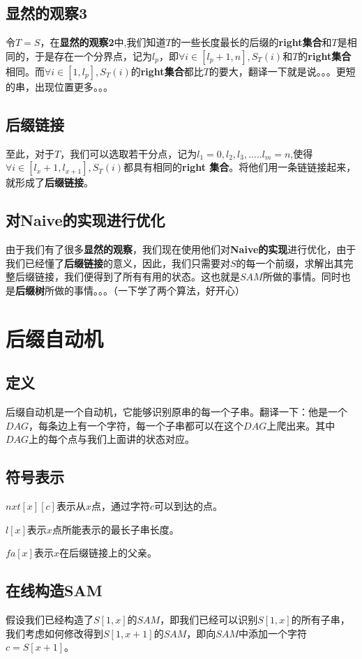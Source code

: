 \documentclass[UTF8]{article}
\begin{document}
\subsection{显然的观察3}
令$T = S$，在\textbf{显然的观察2}中,我们知道$T$的一些长度最长的后缀的\textbf{right集合}和$T$是相同的，于是存在一个分界点，记为$l_p$，即$\forall i\in[l_p+1,n],S_{T}(i)$和$T$的\textbf{right集合}相同。而$\forall i\in[1,l_p],S_{T}(i)$的\textbf{right集合}都比$T$的要大，翻译一下就是说。。。更短的串，出现位置更多。。。
\subsection{后缀链接}\label{suffix_link}
至此，对于$T$，我们可以选取若干分点，记为$l_1 = 0,l_2,l_3,.....l_m = n$,使得$\forall i\in[l_x + 1,l_{x+1}],S_{T}(i)$都具有相同的\textbf{right 集合}。将他们用一条链链接起来，就形成了\textbf{后缀链接}。
\subsection{对Naive的实现进行优化}
由于我们有了很多\textbf{显然的观察}，我们现在使用他们对\textbf{Naive的实现}进行优化，由于我们已经懂了\textbf{后缀链接}的意义，因此，我们只需要对$S$的每一个前缀，求解出其完整后缀链接，我们便得到了所有有用的状态。这也就是$SAM$所做的事情。同时也是\textbf{后缀树}所做的事情。。。（一下学了两个算法，好开心）

\vspace{\baselineskip}
\noindent\hrulefill

\section{后缀自动机}
\subsection{定义}
后缀自动机是一个自动机，它能够识别原串的每一个子串。翻译一下：他是一个$DAG$，每条边上有一个字符，每一个子串都可以在这个$DAG$上爬出来。其中$DAG$上的每个点与我们上面讲的状态对应。

\subsection{符号表示}
$nxt[x][c]$表示从$x$点，通过字符$c$可以到达的点。

$l[x]$表示$x$点所能表示的最长子串长度。

$fa[x]$表示$x$在后缀链接上的父亲。
\subsection{在线构造SAM}\label{construction}
假设我们已经构造了$S[1,x]$的$SAM$，即我们已经可以识别$S[1,x]$的所有子串，我们考虑如何修改得到$S[1,x+1]$的$SAM$，即向$SAM$中添加一个字符$c = S[x+1]$。
\end{document}
